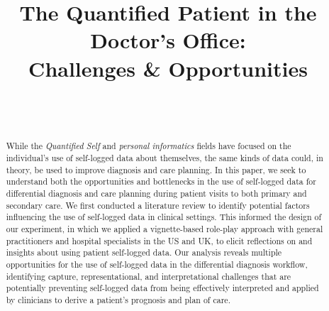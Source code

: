 \documentclass{sigchi}
\begin{document}
\title{The Quantified Patient in the Doctor's Office: \\[0.1cm]Challenges \& Opportunities}

\author{%
  \\
  \\
}



\maketitle


\begin{abstract}
While the \emph{Quantified Self} and \emph{personal informatics} fields have focused on the individual's use of self-logged data about themselves, the same kinds of data could, in theory, be used to improve diagnosis and care planning.  In this paper, we seek to understand both the opportunities and bottlenecks in the use of self-logged data for differential diagnosis and care planning during patient visits to both primary and secondary care. We first conducted a literature review to identify potential factors influencing the use of self-logged data in clinical settings.  This informed the design of our experiment, in which we applied a vignette-based role-play approach with general practitioners and hospital specialists in the US and UK, to elicit reflections on and insights about using patient self-logged data.  Our analysis reveals multiple opportunities for the use of self-logged data in the differential diagnosis workflow, identifying capture, representational, and interpretational challenges that are potentially preventing self-logged data from being effectively interpreted and applied by clinicians to derive a patient's prognosis and plan of care.
\end{abstract}
\end{document}
